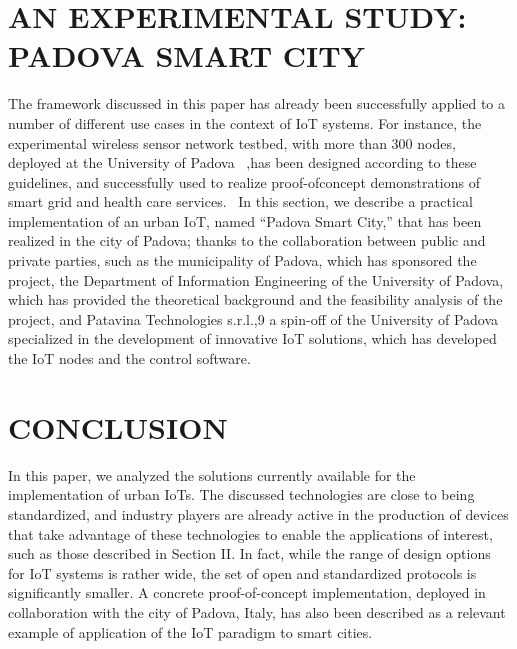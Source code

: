 \documentclass[conference]{IEEEtran}
\begin{document}
	
	
	\section{AN EXPERIMENTAL STUDY: PADOVA SMART CITY}
	The framework discussed in this paper has already been
	successfully applied to a number of different use cases in the context of IoT systems. For instance, the experimental wireless sensor network testbed, with more than 300 nodes, deployed at the University of Padova ~\autocite{r7},has been designed according to these guidelines, and successfully used to realize proof-ofconcept demonstrations of smart grid and health care services.~\autocite{r8}
	In this section, we describe a practical implementation of an urban IoT, named “Padova Smart City,” that has been realized in the city of Padova; thanks to the collaboration between public and private parties, such as the municipality of Padova, which has sponsored the project, the Department of Information Engineering
	of the University of Padova, which has provided the
	theoretical background and the feasibility analysis of the project, and Patavina Technologies s.r.l.,9 a spin-off of the University of Padova specialized in the development of innovative IoT solutions, which has developed the IoT nodes and the control software.~\autocite{r9}
	
	
	
	
	
	
	
	
	
	
	
	
	\section{CONCLUSION}
	In this paper, we analyzed the solutions currently available for the implementation of urban IoTs. The discussed technologies are close to being standardized, and industry players are already active in the production of devices that take advantage of these technologies to enable the applications of interest, such as those described in Section II. In fact, while the range of design options for IoT systems is rather wide, the set of open and standardized protocols is significantly smaller. A concrete proof-of-concept implementation, deployed in collaboration with the city of Padova, Italy, has also been described as a relevant example of application of the IoT paradigm to smart cities.

\printbibliography
\end{document}
